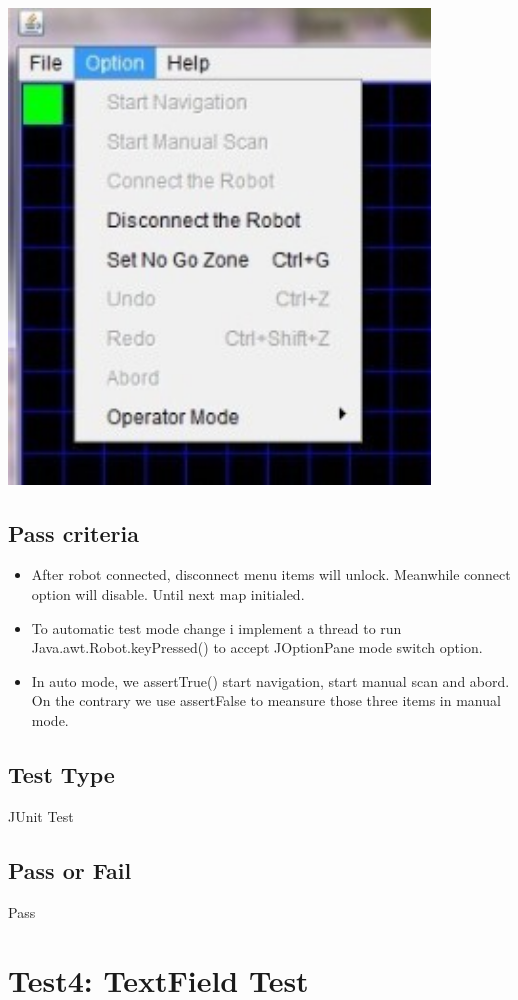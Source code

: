 \documentclass[11pt, a4paper]{report}
\begin{document}
 \begin{center}
 \includegraphics[width=11.20cm]{ManualModeMenu}
\end{center}
\subsection{Pass criteria}
\begin{itemize}
\item After robot connected, disconnect menu items will unlock. Meanwhile connect option will disable. Until next map initialed.
\item To automatic test mode change i implement a thread to run Java.awt.Robot.keyPressed() to accept JOptionPane mode switch option. 
\item In auto mode, we assertTrue() start navigation, start manual scan and abord. On the contrary we use assertFalse to meansure those three items in manual mode.

\end{itemize}
\subsection{Test Type}
JUnit Test
\subsection{Pass or Fail}
Pass
\section{Test4: TextField Test}
\end{document}

